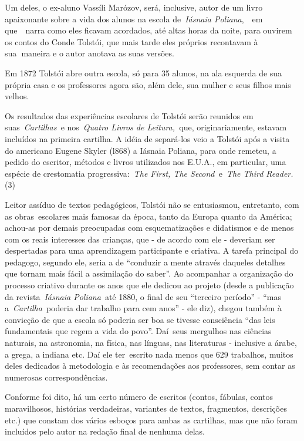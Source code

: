 Um deles, o ex-aluno Vassíli Marózov, será, inclusive, autor de um livro
apaixonante sobre a vida dos alunos na escola de~\emph{Iásnaia
Poliana},~~em que~~narra como eles ficavam acordados, até altas horas da
noite, para ouvirem os contos do Conde Tolstói, que mais tarde eles
próprios recontavam à sua\textbf{~}maneira e o autor anotava as suas
versões.

Em 1872 Tolstói abre outra escola, só para 35 alunos, na ala esquerda de
sua própria casa e os professores agora são, além dele, sua mulher e
seus filhos mais velhos.

Os resultados das experiências escolares de Tolstói serão reunidos em
suas~\emph{Cartilhas~}e nos~\emph{Quatro Livros de Leitura,~}que,
originariamente, estavam incluídos na primeira cartilha. A idéia de
separá-los veio a Tolstói após a visita do americano Eugene Skyler
(l868) a Iásnaia Poliana, para onde remeteu, a pedido do escritor,
métodos e livros utilizados nos E.U.A., em particular, uma espécie de
crestomatia progressiva:~\emph{The First, The Second~}e~\emph{The Third
Reader.}(3)

Leitor assíduo de textos pedagógicos, Tolstói não se entusiasmou,
entretanto, com as obras~escolares mais famosas da época, tanto da
Europa quanto da América; achou-as por demais preocupadas com
esquematizações e didatismos e de menos com os reais interesses das
crianças, que - de acordo com ele - deveriam ser despertadas para uma
aprendizagem participante e criativa. A tarefa principal do pedagogo,
segundo ele, seria a de ``conduzir a mente através daqueles detalhes que
tornam mais fácil a assimilação do saber''. Ao acompanhar a organização
do processo criativo durante os anos que ele dedicou ao projeto (desde a
publicação da revista~\emph{Iásnaia Poliana}~até 1880, o final de seu
``terceiro período'' - ``mas a~\emph{Cartilha}~poderia dar trabalho para
cem anos'' - ele diz), chegou também à convicção de que a escola só
poderia ser boa se tivesse consciência ``das leis fundamentais que regem
a vida do povo''. Daí~seus mergulhos nas ciências naturais, na
astronomia, na física, nas línguas, nas literaturas - inclusive a árabe,
a grega, a indiana etc. Daí ele ter~escrito nada menos que 629
trabalhos, muitos deles dedicados à metodologia e às recomendações aos
professores, sem contar as numerosas correspondências.~~

Conforme foi dito, há um certo número de escritos (contos, fábulas,
contos maravilhosos, histórias verdadeiras, variantes de textos,
fragmentos, descrições etc.) que constam dos vários esboços para ambas
as cartilhas, mas que não foram incluídos pelo autor na redação final de
nenhuma delas.

